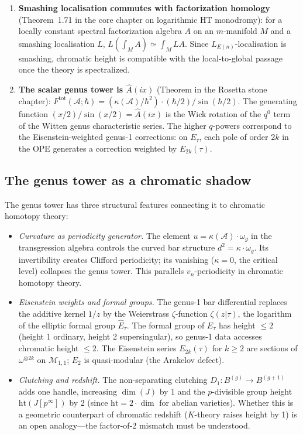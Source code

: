 \documentclass[11pt]{article}
\newcommand{\cA}{\mathcal{A}}
\newcommand{\cM}{\mathcal{M}}
\begin{document}
\begin{enumerate}
\item \textbf{Smashing localisation commutes with factorization
  homology} (Theorem~1.71 in the core chapter on logarithmic HT
  monodromy): for a locally constant spectral factorization algebra $A$
  on an $m$-manifold $M$ and a smashing localisation $L$,
  $L(\int_M A) \simeq \int_M LA$.  Since $L_{E(n)}$-localisation is
  smashing, chromatic height is compatible with the local-to-global
  passage once the theory is spectralized.

\item \textbf{The scalar genus tower is $\hat{A}(ix)$}
  (Theorem in the Rosetta stone chapter):
  $F^{\mathrm{tot}}(\cA;\hbar)
  = (\kappa(\cA)/\hbar^2) \cdot (\hbar/2)/\sin(\hbar/2)$.
  The generating function $(x/2)/\sin(x/2) = \hat{A}(ix)$ is the
  Wick rotation of the $q^0$ term of the Witten genus characteristic
  series.  The higher $q$-powers correspond to the Eisenstein-weighted
  genus-1 corrections: on $E_\tau$, each pole of order $2k$ in the OPE
  generates a correction weighted by $E_{2k}(\tau)$.
\end{enumerate}

\subsection{The genus tower as a chromatic shadow}

The genus tower has three structural features connecting it to
chromatic homotopy theory:

\begin{itemize}
\item \textit{Curvature as periodicity generator.}
  The element $u = \kappa(\cA) \cdot \omega_g$ in the transgression
  algebra controls the curved bar structure $d^2 = \kappa \cdot \omega_g$.
  Its invertibility creates Clifford periodicity; its vanishing
  ($\kappa = 0$, the critical level) collapses the genus tower.
  This parallels $v_n$-periodicity in chromatic homotopy theory.

\item \textit{Eisenstein weights and formal groups.}
  The genus-1 bar differential replaces the additive kernel $1/z$
  by the Weierstrass $\zeta$-function $\zeta(z|\tau)$, the logarithm
  of the elliptic formal group $\hat{E}_\tau$.  The formal group of
  $E_\tau$ has height $\le 2$ (height 1 ordinary, height 2
  supersingular), so genus-1 data accesses chromatic height $\le 2$.
  The Eisenstein series $E_{2k}(\tau)$ for $k \ge 2$ are sections of
  $\omega^{\otimes 2k}$ on $\cM_{1,1}$; $E_2$ is quasi-modular
  (the Arakelov defect).

\item \textit{Clutching and redshift.}
  The non-separating clutching $D_1 \colon B^{(g)} \to B^{(g+1)}$
  adds one handle, increasing $\dim(J)$ by 1 and the $p$-divisible
  group height $\mathrm{ht}(J[p^\infty])$ by 2 (since
  $\mathrm{ht} = 2 \cdot \dim$ for abelian varieties).
  Whether this is a geometric counterpart of chromatic redshift
  ($K$-theory raises height by 1) is an open analogy---the factor-of-2
  mismatch must be understood.
\end{itemize}
\end{document}
